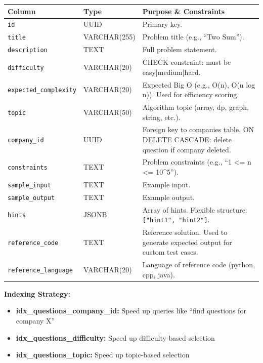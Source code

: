 \documentclass[12pt,a4paper,oneside]{article}
\newcommand{\varname}[1]{\texttt{#1}}
\begin{document}
\begin{table}[H]
\centering
\small
\begin{tabular}{|p{2.3cm}|p{1.8cm}|p{9.9cm}|}
\hline
\textbf{Column} & \textbf{Type} & \textbf{Purpose \& Constraints} \\
\hline
\varname{id} & UUID & Primary key. \\
\hline
\varname{title} & VARCHAR(255) & Problem title (e.g., ``Two Sum''). \\
\hline
\varname{description} & TEXT & Full problem statement. \\
\hline
\varname{difficulty} & VARCHAR(20) & CHECK constraint: must be easy|medium|hard. \\
\hline
\varname{expected\_complexity} & VARCHAR(20) & Expected Big O (e.g., O(n), O(n log n)). Used for efficiency scoring. \\
\hline
\varname{topic} & VARCHAR(50) & Algorithm topic (array, dp, graph, string, etc.). \\
\hline
\varname{company\_id} & UUID & Foreign key to companies table. ON DELETE CASCADE: delete question if company deleted. \\
\hline
\varname{constraints} & TEXT & Problem constraints (e.g., ``1 <= n <= 10^5''). \\
\hline
\varname{sample\_input} & TEXT & Example input. \\
\hline
\varname{sample\_output} & TEXT & Example output. \\
\hline
\varname{hints} & JSONB & Array of hints. Flexible structure: \texttt{["hint1", "hint2"]}. \\
\hline
\varname{reference\_code} & TEXT & Reference solution. Used to generate expected output for custom test cases. \\
\hline
\varname{reference\_language} & VARCHAR(20) & Language of reference code (python, cpp, java). \\
\hline
\end{tabular}
\end{table}

\textbf{Indexing Strategy:}

\begin{itemize}
    \item \textbf{idx\_questions\_company\_id:} Speed up queries like ``find questions for company X''
    \item \textbf{idx\_questions\_difficulty:} Speed up difficulty-based selection
    \item \textbf{idx\_questions\_topic:} Speed up topic-based selection
\end{itemize}
\end{document}
